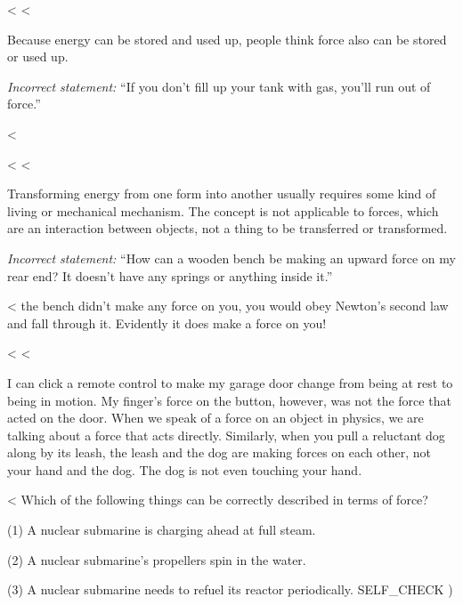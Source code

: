<%
<%

Because energy can be stored and used up, people think force
also can be stored or used up.

\begin{egnoheader}
\emph{Incorrect statement:\/} ``If you don't fill up your tank with
gas, you'll run out of force.''

\noindent<%
\end{egnoheader}

<%
<%

Transforming energy from one form into another usually
requires some kind of living or mechanical mechanism. The
concept is not applicable to forces, which are an interaction
between objects, not a thing to be transferred or transformed.

\begin{egnoheader}
\emph{Incorrect statement:\/} ``How can a wooden bench be making an
upward force on my rear end? It doesn't have any springs or
anything inside it.''

\noindent<%
the bench didn't make any force on you, you would obey
Newton's second law and fall through it. Evidently it does
make a force on you!
\end{egnoheader}

<%
<%

I can click a remote control to make my garage door change
from being at rest to being in motion. My finger's force on
the button, however, was not the force that acted on the
door. When we speak of a force on an object in physics, we
are talking about a force that acts directly. Similarly,
when you pull a reluctant dog along by its leash, the leash
and the dog are making forces on each other, not your hand
and the dog. The dog is not even touching your hand.

<%
Which of the following things can be correctly described in terms of force?

(1) A nuclear submarine is charging ahead at full steam.

(2) A nuclear submarine's propellers spin in the water.

(3) A nuclear submarine needs to refuel its reactor periodically.
  SELF_CHECK
  ) %

